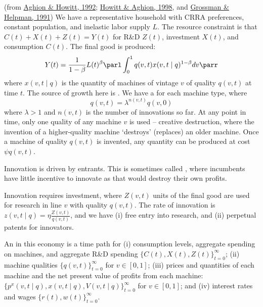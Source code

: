 \documentclass[10pt]{article}
\begin{document}
\begin{model}
	 (from \href{https://www.jstor.org/stable/2951599?seq=1}{Aghion \& Howitt, 1992}; \href{https://link.springer.com/article/10.1023/A:1009769717601}{Howitt \& Aghion, 1998}, and \href{https://www.sciencedirect.com/science/article/pii/001429219190153A}{Grossman \& Helpman, 1991}) We have a representative household with CRRA preferences, constant population, and inelastic labor supply $L$. The resource constraint is that $C(t) + X(t)+Z(t) = Y(t)$ for R\&D $Z(t)$, investment $X(t)$, and consumption $C(t)$. The final good is produced:
	\[Y(t) = \frac{1}{1-\beta}L(t)^\beta \parl \int_0^1 q(v,t)x(v,t \mid q)^{1-\beta}dv\parr\]where $x(v,t \mid q)$ is the quantity of machines of vintage $v$ of quality $q(v,t)$ at time $t$. The source of growth here is . We have a  for each machine type, where \[q(v,t) = \lambda^{n(v,t)} q(v,0)\]where $\lambda > 1$ and $n(v,t)$ is the number of innovations so far. At any point in time, only one quality of any machine $v$ is used -- \ie creative destruction, where the invention of a higher-quality machine `destroys' (replaces) an older machine. Once a machine of quality $q(v,t)$ is invented, any quantity can be produced at cost $\psi q(v,t)$. 
	
	\begin{remark}
		Innovation is driven by entrants. This is sometimes called , where incumbents have little incentive to innovate as that would destroy their own profits.
	\end{remark}
	
	Innovation requires investment, where $Z(v,t)$ units of the final good are used for research in line $v$ with quality $q(v,t)$. The rate of innovation is $z(v,t\mid q) = \eta \frac{Z(v,t)}{q(v,t)}$, and we have (i) free entry into research, and (ii) perpetual patents for innovators.
	
	\begin{definition}
		An  in this economy is a time path for (i) consumption levels, aggregate spending on machines, and aggregate R\&D spending $\{C(t),X(t),Z(t)\}_{t=0}^\infty$; (ii) machine qualities $\{q(v,t)\}_{t=0}^\infty$ for $v \in [0,1]$; (iii) prices and quantities of each machine and the net present value of profits from each machine: $\{p^x(v,t\mid q), x(v,t \mid q), V(v,t\mid q)\}_{t=0}^\infty$ for $v \in [0,1]$; and (iv) interest rates and wages $\{r(t),w(t)\}_{t=0}^\infty$. 
	\end{definition}
	

\end{model}
\end{document}
